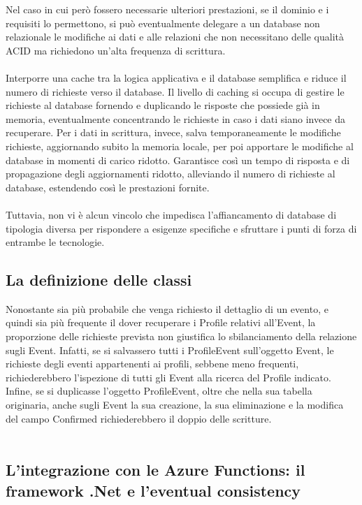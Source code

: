 Nel caso in cui però fossero necessarie ulteriori prestazioni,
se il dominio e i requisiti lo permettono,
si può eventualmente delegare a un database non relazionale le modifiche ai dati e alle relazioni
che non necessitano delle qualità ACID ma richiedono un’alta frequenza di scrittura.\\
\\
Interporre una cache tra la logica applicativa e il database
semplifica e riduce il numero di richieste verso il database.
Il livello di caching si occupa di gestire le richieste al database
fornendo e duplicando le risposte che possiede già in memoria,
eventualmente concentrando le richieste in caso i dati siano invece da recuperare.
Per i dati in scrittura, invece, salva temporaneamente le modifiche richieste,
aggiornando subito la memoria locale,
per poi apportare le modifiche al database in momenti di carico ridotto.
Garantisce così un tempo di risposta e di propagazione degli aggiornamenti ridotto,
alleviando il numero di richieste al database, estendendo così  le prestazioni fornite.\\
\\


Tuttavia, non vi è alcun vincolo che impedisca l'affiancamento di database di tipologia diversa
per rispondere a esigenze specifiche e sfruttare i punti di forza di entrambe le tecnologie.
\\

\subsection{La definizione delle classi}
Nonostante sia più probabile che venga richiesto il dettaglio di un evento,
e quindi sia più frequente il dover recuperare i Profile relativi all’Event,
la proporzione delle richieste prevista non giustifica lo sbilanciamento della relazione sugli Event.
Infatti, se si salvassero tutti i ProfileEvent sull’oggetto Event,
le richieste degli eventi appartenenti ai profili, sebbene meno frequenti,
richiederebbero l’ispezione di tutti gli Event alla ricerca del Profile indicato.
Infine, se si duplicasse l’oggetto ProfileEvent,
oltre che nella sua tabella originaria, anche sugli Event la sua creazione,
la sua eliminazione e la modifica del campo Confirmed richiederebbero il doppio delle scritture.\\
\\



\subsection{L'integrazione con le Azure Functions: il framework .Net e l'eventual consistency}

